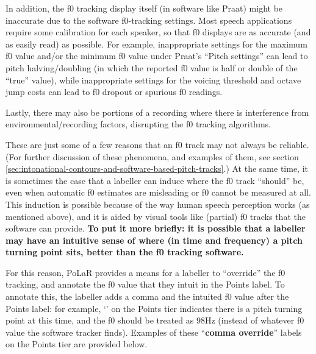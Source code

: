 \documentclass[11pt, twoside]{memoir}
\def\polar#1{{\relsize{-.5}\fontspec[Mapping=tex-text]{Roboto Mono}{#1}}}
\def\polarquot#1{‘\polar{#1}’}
\begin{document}
In addition, the f0 tracking display itself (in software like Praat) might be inaccurate due to the software f0-tracking settings. Most speech applications require some calibration for each speaker, so that f0 displays are as accurate (and as easily read) as possible. For example, inappropriate settings for the maximum f0 value and/or the minimum f0 value under Praat’s “Pitch settings” can lead to pitch halving\slash doubling (in which the reported f0 value is half or double of the “true” value), while inappropriate settings for the voicing threshold and octave jump costs can lead to f0 dropout or spurious f0 readings.

Lastly, there may also be portions of a recording where there is interference from environmental\slash recording factors, disrupting the f0 tracking algorithms.

These are just some of a few reasons that an f0 track may not always be reliable. (For further discussion of these phenomena, and examples of them, see section \ref{sec:intonational-contours-and-software-based-pitch-tracks}.) At the same time, it is sometimes the case that a labeller can induce where the f0 track “should” be, even when automatic f0 estimates are misleading or f0 cannot be measured at all. This induction is possible because of the way human speech perception works (as mentioned above), and it is aided by visual tools like (partial) f0 tracks that the software can provide. \textbf{To put it more briefly: it is possible that a labeller may have an intuitive sense of where (in time and frequency) a pitch turning point sits, better than the f0 tracking software.}

For this reason, PoLaR provides a means for a labeller to “override” the f0 tracking, and annotate the f0 value that they intuit in the Points label. To annotate this, the labeller adds a comma and the intuited f0 value after the Points label: for example, \polarquot{0,98} on the Points tier indicates there is a pitch turning point at this time, and the f0 should be treated as 98Hz (instead of whatever f0 value the software tracker finds). Examples of these “\textbf{comma override}” labels on the Points tier are provided below.
\end{document}
